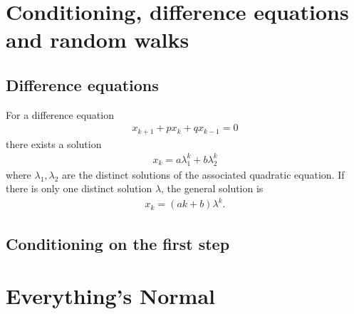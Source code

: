 \documentclass{article}
\begin{document}
\section{Conditioning, difference equations and random walks}
\subsection{Difference equations}
\begin{theorem}
    For a difference equation
    \begin{align*}
        x_{k+1}+px_k+qx_{k-1}=0
    \end{align*}
    there exists a solution
    \begin{align*}
        x_k = a\lambda_1^k+b\lambda_2^k
    \end{align*}
    where $\lambda_1,\lambda_2$ are the distinct solutions of the associated quadratic equation.
    If there is only one distinct solution $\lambda$, the general solution is
    \begin{align*}
        x_k = (ak + b)\lambda^k.
    \end{align*}
\end{theorem}
\subsection{Conditioning on the first step}
\section{Everything's Normal}
\end{document}
